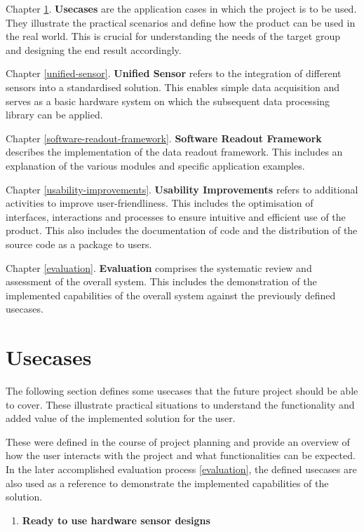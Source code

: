 Chapter \ref{usecases}. \textbf{Usecases} are the application cases in
which the project is to be used. They illustrate the practical scenarios
and define how the product can be used in the real world. This is
crucial for understanding the needs of the target group and designing
the end result accordingly.

Chapter \ref{unified-sensor}. \textbf{Unified Sensor} refers to the
integration of different sensors into a standardised solution. This
enables simple data acquisition and serves as a basic hardware system on
which the subsequent data processing library can be applied.

Chapter \ref{software-readout-framework}. \textbf{Software Readout
Framework} describes the implementation of the data readout framework.
This includes an explanation of the various modules and specific
application examples.

Chapter \ref{usability-improvements}. \textbf{Usability Improvements}
refers to additional activities to improve user-friendliness. This
includes the optimisation of interfaces, interactions and processes to
ensure intuitive and efficient use of the product. This also includes
the documentation of code and the distribution of the source code as a
package to users.

Chapter \ref{evaluation}. \textbf{Evaluation} comprises the systematic
review and assessment of the overall system. This includes the
demonstration of the implemented capabilities of the overall system
against the previously defined usecases.

\hypertarget{usecases}{%
\chapter{Usecases}\label{usecases}}

The following section defines some usecases that the future project
should be able to cover. These illustrate practical situations to
understand the functionality and added value of the implemented solution
for the user.

These were defined in the course of project planning and provide an
overview of how the user interacts with the project and what
functionalities can be expected. In the later accomplished evaluation
process \ref{evaluation}, the defined usecases are also used as a
reference to demonstrate the implemented capabilities of the solution.

\begin{enumerate}
\def\labelenumi{\arabic{enumi}.}
\tightlist
\item
  \textbf{Ready to use hardware sensor designs}
\end{enumerate}

